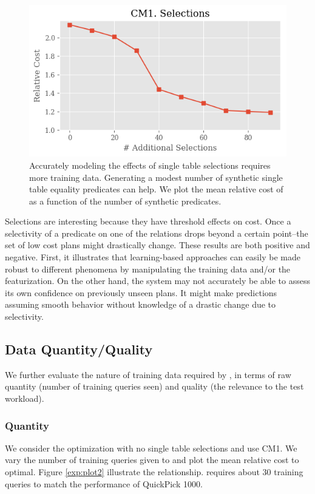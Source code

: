 \begin{figure}
    \centering
    \includegraphics[width=0.8\columnwidth]{exp/exp1_plot1.png}
    \caption{Accurately modeling the effects of single table selections requires more training data. Generating a modest number of synthetic single table equality predicates can help. We plot the mean relative cost of \sys as a function of the number of synthetic predicates. \label{exp:plot1}}
\end{figure}

Selections are interesting because they have threshold effects on cost. Once a selectivity of a predicate on one of the relations drops beyond a certain point--the set of low cost plans might drastically change. These results are both positive and negative. First, it illustrates that learning-based approaches can easily be made robust to different phenomena by manipulating the training data and/or the featurization. On the other hand, the system may not accurately be able to assess its own confidence on previously unseen plans. It might make predictions assuming smooth behavior without knowledge of a drastic change due to selectivity. 

\subsection{Data Quantity/Quality}
We further evaluate the nature of training data required by \sys, in terms of raw quantity (number of training queries seen) and quality (the relevance to the test workload).

\subsubsection{Quantity}
We consider the optimization with no single table selections and use CM1. We vary the number of training queries given to \sys and plot the mean relative cost to optimal. Figure \ref{exp:plot2} illustrate the relationship. \sys requires about 30 training queries to match the performance of QuickPick 1000.

